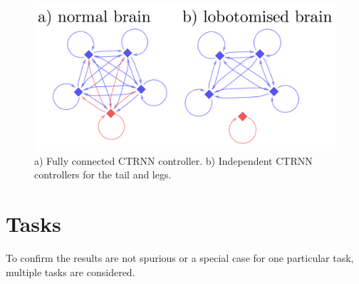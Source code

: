 \begin{figure}[h]
  \centering
  \includegraphics[width=5in]{fig/ctrnn-figures.pdf}
  \vspace{-15pt}
  \caption[Variation of CTRNN controllers]{\label{ctrnn-figures}a)
    Fully connected CTRNN controller. b) Independent CTRNN controllers
    for the tail and legs.}
\end{figure}

\section{Tasks}

To confirm the results are not spurious or a special case for one
particular task, multiple tasks are considered.  




